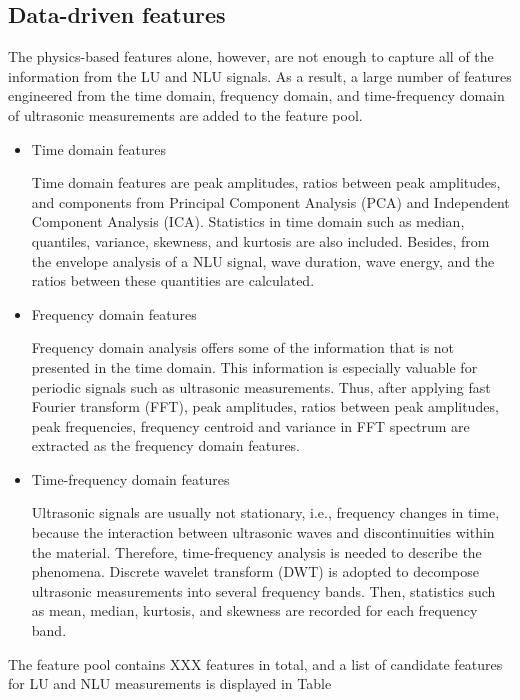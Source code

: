 \subsection{Data-driven features}
The physics-based features alone, however, are not enough to capture all of the information from the LU and NLU signals. As a result, a large number of features engineered from the time domain, frequency domain, and time-frequency domain of ultrasonic measurements are added to the feature pool.

\begin{itemize}
    \item Time domain features
    
    Time domain features are peak amplitudes, ratios between peak amplitudes, and components from Principal Component Analysis (PCA) and Independent Component Analysis (ICA). Statistics in time domain such as median, quantiles, variance, skewness, and kurtosis are also included. Besides, from the envelope analysis of a NLU signal, wave duration, wave energy, and the ratios between these quantities are calculated.

    \item Frequency domain features
    
    Frequency domain analysis offers some of the information that is not presented in the time domain. This information is especially valuable for periodic signals such as ultrasonic measurements. Thus, after applying fast Fourier transform (FFT), peak amplitudes, ratios between peak amplitudes, peak frequencies, frequency centroid and variance in FFT spectrum are extracted as the frequency domain features.

    \item Time-frequency domain features
    
    Ultrasonic signals are usually not stationary, i.e., frequency changes in time, because the interaction between ultrasonic waves and discontinuities within the material. Therefore, time-frequency analysis is needed to describe the phenomena. Discrete wavelet transform (DWT) is adopted to decompose ultrasonic measurements into several frequency bands. Then, statistics such as mean, median, kurtosis, and skewness are recorded for each frequency band.
\end{itemize}

The feature pool contains XXX features in total, and a list of candidate features for LU and NLU measurements is displayed in Table

